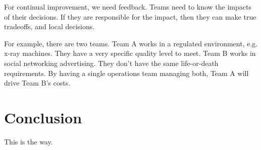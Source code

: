 \documentclass{article}
\begin{document}
For continual improvement, we need feedback. Teams need to know the impacts of their decisions. If they are responsible for the impact, then they can make true tradeoffs, and local decisions.

For example, there are two teams. Team A works in a regulated environment, e.g. x-ray machines. They have a very specific quality level to meet. Team B works in social networking advertising. They don't have the same life-or-death requirements. By having a single operations team managing both, Team A will drive Team B's costs.

\section*{Conclusion}
This is the way.
\end{document}
